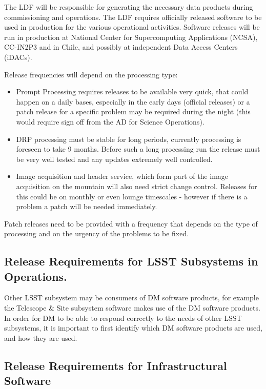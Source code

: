 The \gls{LDF} will be responsible for generating the necessary data products during commissioning and operations. 
The \gls{LDF} requires officially released software to be used in production for the various operational activities.
Software releases will be run in production at National \gls{Center} for Supercomputing Applications (\gls{NCSA}), CC-IN2P3 and in Chile, and possibly at independent Data Access Centers (iDACs).

Release frequencies will depend on the processing type:
\begin{itemize}
\item Prompt Processing requires releases to be available very quick, that could happen on a daily bases, especially in the early days (official releases)
 or a  patch release  for a specific problem may be required during the night (this would require sign off from the \gls{AD} for Science \gls{Operations}).
\item \gls{DRP} processing  must be stable for long periods, currently processing is foreseen to take 9 months.  Before such a long processing run the release must be very well tested and any updates extremely well controlled.
\item Image acquisition and header service, which form part of the image acquisition on the mountain will also need strict change control. Releases for this could be on monthly or even lounge timescales - however if there is a problem a patch will be needed immediately.
\end{itemize}

Patch releases need to be provided with a frequency that depends on the type of processing
and on the urgency of the problems to be fixed.


\subsection{Release Requirements for \gls{LSST} Subsystems in \gls{Operations}.} \label{sec:otherreqs}

Other \gls{LSST} subsystem may be consumers of \gls{DM} software products, for example the Telescope \& Site subsystem software makes use of the \gls{DM} software products. 
In order for \gls{DM} to be able to respond correctly to the needs of other \gls{LSST} subsystems, it is important to first identify which \gls{DM} software products are used, and how they are used.


\subsection{Release Requirements for Infrastructural Software} \label{sec:infreqs}

